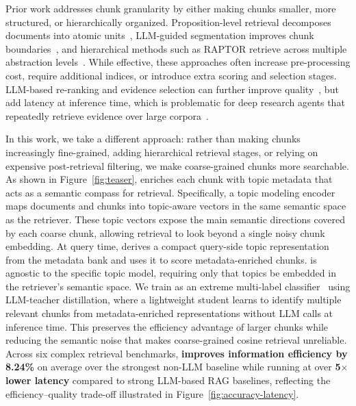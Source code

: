 Prior work addresses chunk granularity by either making chunks smaller, more structured, or hierarchically organized. Proposition-level retrieval decomposes documents into atomic units~\cite{chen-etal-2024-dense}, LLM-guided segmentation improves chunk boundaries~\cite{zhao2024meta, zhao-etal-2025-moc}, and hierarchical methods such as RAPTOR retrieve across multiple abstraction levels~\cite{sarthi2024raptor}. While effective, these approaches often increase pre-processing cost, require additional indices, or introduce extra scoring and selection stages. LLM-based re-ranking and evidence selection can further improve quality~\cite{tao-etal-2025-saki}, but add latency at inference time, which is problematic for deep research agents that repeatedly retrieve evidence over large corpora~\cite{zheng-etal-2025-deepresearcher}.

In this work, we take a different approach: rather than making chunks increasingly fine-grained, adding hierarchical retrieval stages, or relying on expensive post-retrieval filtering, we make coarse-grained chunks more searchable. As shown in Figure~\ref{fig:teaser}, \textbf{\name{}} enriches each chunk with topic metadata that acts as a semantic compass for retrieval. Specifically, a topic modeling encoder maps documents and chunks into topic-aware vectors in the same semantic space as the retriever. These topic vectors expose the main semantic directions covered by each coarse chunk, allowing retrieval to look beyond a single noisy chunk embedding. At query time, \name{} derives a compact query-side topic representation from the metadata bank and uses it to score metadata-enriched chunks. \name{} is agnostic to the specific topic model, requiring only that topics be embedded in the retriever's semantic space. We train \name{} as an extreme multi-label classifier~\cite{prabhu2025mogic} using LLM-teacher distillation, where a lightweight student learns to identify multiple relevant chunks from metadata-enriched representations without LLM calls at inference time. This preserves the efficiency advantage of larger chunks while reducing the semantic noise that makes coarse-grained cosine retrieval unreliable. Across six complex retrieval benchmarks, \name{} \textbf{improves information efficiency by 8.24\%} on average over the strongest non-LLM baseline while running at over \textbf{5$\times$ lower latency} compared to strong LLM-based RAG baselines, reflecting the efficiency--quality trade-off illustrated in Figure~\ref{fig:accuracy-latency}.


